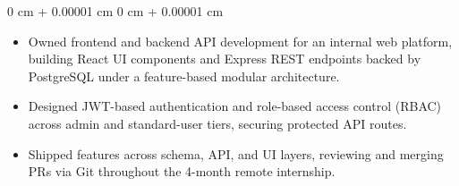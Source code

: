 \documentclass[10pt, letterpaper]{article}
\newenvironment{highlights}{
    \begin{itemize}[
        topsep=0.10 cm,
        parsep=0.10 cm,
        partopsep=0pt,
        itemsep=0pt,
        leftmargin=0 cm + 10pt
    ]
}{
    \end{itemize}
} %
\newenvironment{onecolentry}{
    \begin{adjustwidth}{
        0 cm + 0.00001 cm
    }{
        0 cm + 0.00001 cm
    }
}{
    \end{adjustwidth}
} %
\newenvironment{twocolentry}[2][]{
    \onecolentry
    \def\secondColumn{#2}
    \setcolumnwidth{\fill, 4.5 cm}
    \begin{paracol}{2}
}{
    \switchcolumn \raggedleft \secondColumn
    \end{paracol}
    \endonecolentry
} %
\begin{document}
        \vspace{0.10 cm}
        \begin{onecolentry}
            \begin{highlights}
                \item Owned frontend and backend API development for an internal web platform, building React UI components and Express REST endpoints backed by PostgreSQL under a feature-based modular architecture.
                \item Designed JWT-based authentication and role-based access control (RBAC) across admin and standard-user tiers, securing protected API routes.
                \item Shipped features across schema, API, and UI layers, reviewing and merging PRs via Git throughout the 4-month remote internship.
            \end{highlights}
        \end{onecolentry}






\end{document}
